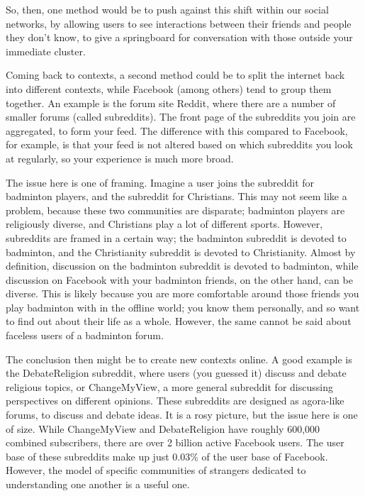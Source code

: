 \documentclass[]{article}
\begin{document}
So, then, one method would be to push against this shift within our
social networks, by allowing users to see interactions between their
friends and people they don't know, to give a springboard for
conversation with those outside your immediate cluster.

Coming back to contexts, a second method could be to split the internet
back into different contexts, while Facebook (among others) tend to
group them together. An example is the forum site Reddit, where there
are a number of smaller forums (called subreddits). The front page of
the subreddits you join are aggregated, to form your feed. The
difference with this compared to Facebook, for example, is that your
feed is not altered based on which subreddits you look at regularly, so
your experience is much more broad.

The issue here is one of framing. Imagine a user joins the subreddit for
badminton players, and the subreddit for Christians. This may not seem
like a problem, because these two communities are disparate; badminton
players are religiously diverse, and Christians play a lot of different
sports. However, subreddits are framed in a certain way; the badminton
subreddit is devoted to badminton, and the Christianity subreddit is
devoted to Christianity. Almost by definition, discussion on the
badminton subreddit is devoted to badminton, while discussion on
Facebook with your badminton friends, on the other hand, can be diverse.
This is likely because you are more comfortable around those friends you
play badminton with in the offline world; you know them personally, and
so want to find out about their life as a whole. However, the same
cannot be said about faceless users of a badminton forum.

The conclusion then might be to create new contexts online. A good
example is the DebateReligion subreddit\autocite{DebateReligion}, where
users (you guessed it) discuss and debate religious topics, or
ChangeMyView\autocite{ChangeMyView}, a more general subreddit for
discussing perspectives on different opinions. These subreddits are
designed as agora-like forums, to discuss and debate ideas. It is a rosy
picture, but the issue here is one of size. While ChangeMyView and
DebateReligion have roughly 600,000 combined subscribers, there are over
2 billion active Facebook
users\autocite{StatistaFacebookUsersWorldwide}. The user base of these
subreddits make up just 0.03\% of the user base of Facebook. However,
the model of specific communities of strangers dedicated to
understanding one another is a useful one.
\end{document}
